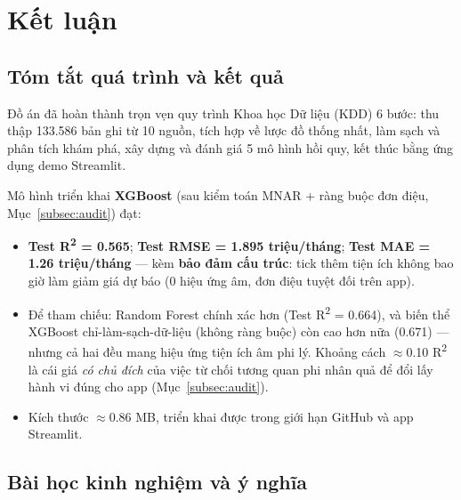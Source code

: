 \section{Kết luận}
\label{sec:conclusion}

\subsection{Tóm tắt quá trình và kết quả}

Đồ án đã hoàn thành trọn vẹn quy trình Khoa học Dữ liệu (KDD) 6 bước:
thu thập 133.586 bản ghi từ 10 nguồn, tích hợp về lược đồ thống nhất,
làm sạch và phân tích khám phá, xây dựng và đánh giá 5 mô hình hồi quy,
kết thúc bằng ứng dụng demo Streamlit.

Mô hình triển khai \textbf{XGBoost} (sau kiểm toán MNAR + ràng buộc đơn điệu,
Mục~\ref{subsec:audit}) đạt:
\begin{itemize}[leftmargin=*, itemsep=2pt]
  \item \textbf{Test R\textsuperscript{2} = 0.565}; \textbf{Test RMSE = 1.895 triệu/tháng};
        \textbf{Test MAE = 1.26 triệu/tháng} — kèm \textbf{bảo đảm cấu trúc}:
        tick thêm tiện ích không bao giờ làm giảm giá dự báo
        (0 hiệu ứng âm, đơn điệu tuyệt đối trên app).
  \item Để tham chiếu: Random Forest chính xác hơn (Test R\textsuperscript{2} = 0.664), và
        biến thể XGBoost chỉ-làm-sạch-dữ-liệu (không ràng buộc) còn cao hơn nữa (0.671) —
        nhưng cả hai đều mang hiệu ứng tiện ích âm phi lý. Khoảng cách $\approx$0.10
        R\textsuperscript{2} là cái giá \textit{có chủ đích} của việc từ chối tương quan
        phi nhân quả để đổi lấy hành vi đúng cho app (Mục~\ref{subsec:audit}).
  \item Kích thước $\approx$0.86 MB, triển khai được trong giới hạn GitHub và app Streamlit.
\end{itemize}

\subsection{Bài học kinh nghiệm và ý nghĩa}

